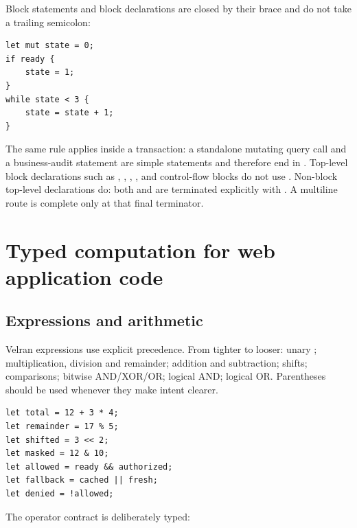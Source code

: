 Block statements and block declarations are closed by their brace and do not take a trailing semicolon:

\begin{lstlisting}[language=Velran]
let mut state = 0;
if ready {
    state = 1;
}
while state < 3 {
    state = state + 1;
}
\end{lstlisting}

The same rule applies inside a transaction: a standalone mutating query call and a business-audit statement are simple statements and therefore end in \code{;}. Top-level block declarations such as , , , , and control-flow blocks do not use \code{;}. Non-block top-level declarations do: both  and  are terminated explicitly with \code{;}. A multiline route is complete only at that final terminator.

\section{Typed computation for web application code}

\subsection*{Expressions and arithmetic}

Velran expressions use explicit precedence. From tighter to looser: unary \code{!}; multiplication, division and remainder; addition and subtraction; shifts; comparisons; bitwise AND/XOR/OR; logical AND; logical OR. Parentheses should be used whenever they make intent clearer.

\begin{lstlisting}[language=Velran]
let total = 12 + 3 * 4;
let remainder = 17 % 5;
let shifted = 3 << 2;
let masked = 12 & 10;
let allowed = ready && authorized;
let fallback = cached || fresh;
let denied = !allowed;
\end{lstlisting}

The operator contract is deliberately typed:


